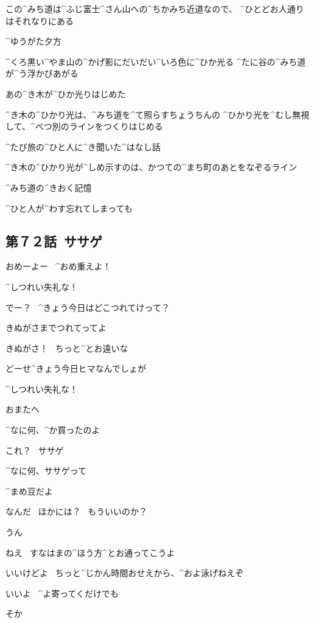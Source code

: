 \A この^{みち}{道}は^{ふじ}{富士}^{さん}{山}への^{ちかみち}{近道}なので、
^{ひとどお}{人通}りはそれなりにある

\page[85]
\A ^{ゆうがた}{夕方}

\A ^{くろ}{黒}い^{やま}{山}の^{かげ}{影}にだいだい^{いろ}{色}に^{ひか}{光}る
^{たに}{谷}の^{みち}{道}が^{う}{浮}かびあがる

\page
\A あの^{き}{木}が^{ひか}{光}りはじめた

\page
\A ^{き}{木}の^{ひかり}{光}は、^{みち}{道}を^{て}{照}らすちょうちんの
^{ひかり}{光}を^{むし}{無視}して、^{べつ}{別}のラインをつくりはじめる

\A ^{たび}{旅}の^{ひと}{人}に^{き}{聞}いた^{はなし}{話}

\page
\A ^{き}{木}の^{ひかり}{光}が^{しめ}{示}すのは、かつての^{まち}{町}のあとをなぞるライン

\A ^{みち}{道}の^{きおく}{記憶}

\A ^{ひと}{人}が^{わす}{忘}れてしまっても


\subsection{第７２話\ ササゲ}

\page[95]
\T おめーよー
\ ^{おめ}{重}えよ！

\M ^{しつれい}{失礼}な！

\T でー？
\ ^{きょう}{今日}はどこつれてけって？

\M きぬがさまでつれてってよ

\T きぬがさ！
\ ちっと^{とお}{遠}いな

\M どーせ^{きょう}{今日}ヒマなんでしょが

\T ^{しつれい}{失礼}な！

\page
\M おまたへ

\T ^{なに}{何}、^{か}{買}ったのよ

\M これ？
\ ササゲ

\T ^{なに}{何}、ササゲって

\M ^{まめ}{豆}だよ

\T なんだ
\ ほかには？
\ もういいのか？

\M うん

\page
\M ねえ
\ すなはまの^{ほう}{方}^{とお}{通}ってこうよ

\T いいけどよ
\ ちっと^{じかん}{時間}おせえから、^{およ}{泳}げねえぞ

\M いいよ
\ ^{よ}{寄}ってくだけでも

\T そか

